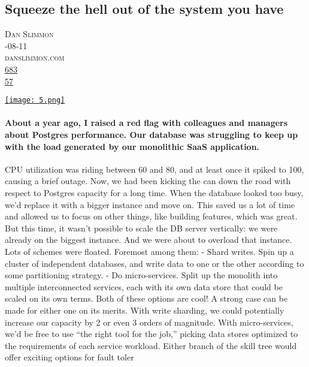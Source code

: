 \documentclass[10pt,a4paper]{article}
\begin{document}
\subsection{Squeeze the hell out of the system you have}
\noindent\begin{minipage}[t]{0.20\linewidth}
\vspace{0pt}
\noindent\textsc{\footnotesize
{\scriptsize\faUser}\space 
Dan Slimmon \\
{\scriptsize\faCalendar}-08-11 \\
{\scriptsize\faGlobe}\space 
danslimmon.com \\
{\scriptsize\faThumbsOUp}\space 
\href{http://news.ycombinator.com/item?id=37091983\&utm\_term=comment}{683} \\
{\scriptsize\faComments}\space 
\href{http://news.ycombinator.com/item?id=37091983\&utm\_term=comment}{57} \\
}
\end{minipage} %
\begin{minipage}[t]{0.80\linewidth}
\vspace{0pt}
\begin{multicols}{2}

    \href{https://blog.danslimmon.com/2023/08/11/squeeze-the-hell-out-of-the-system-you-have/\#like-2777?utm\_source=hackernewsletter\&utm\_medium=email\&utm\_term=fav}{
        \texttt{[image: 5.png]}
    }
  
\paragraph{About a year ago, I raised a red flag with colleagues and managers about Postgres performance. Our database was struggling to keep up with the load generated by our monolithic SaaS application.}
 CPU utilization was riding between 60 and 80, and at least once it spiked to 100, causing a brief outage.
Now, we had been kicking the can down the road with respect to Postgres capacity for a long time. When the database looked too busy, we’d replace it with a bigger instance and move on. This saved us a lot of time and allowed us to focus on other things, like building features, which was great.
But this time, it wasn’t possible to scale the DB server vertically: we were already on the biggest instance. And we were about to overload that instance.
Lots of schemes were floated. Foremost among them:
- Shard writes. Spin up a cluster of independent databases, and write data to one or the other according to some partitioning strategy.
- Do micro-services. Split up the monolith into multiple interconnected services, each with its own data store that could be scaled on its own terms.
Both of these options are cool! A strong case can be made for either one on its merits. With write sharding, we could potentially increase our capacity by 2 or even 3 orders of magnitude. With micro-services, we’d be free to use “the right tool for the job,” picking data stores optimized to the requirements of each service workload. Either branch of the skill tree would offer exciting options for fault toler

\end{multicols}
\end{minipage}
\end{document}
